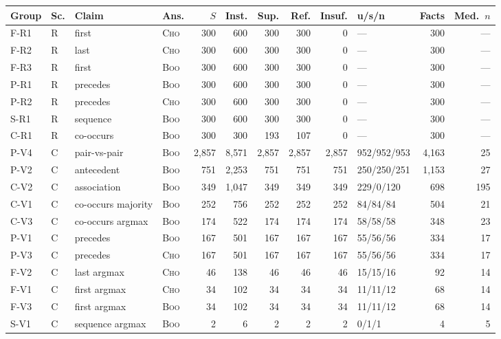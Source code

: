 \begin{table}[t]
\centering
\small
\begin{tabular}{llllrrrrrlrr}
\toprule
Group & Sc. & Claim & Ans. & $S$ & Inst. & Sup. & Ref. & Insuf. & u/s/n & Facts & Med.\ $n$ \\
\midrule
F-R1 & R & first & \textsc{Cho} & 300 & 600 & 300 & 300 & 0 & --- & 300 & --- \\
F-R2 & R & last & \textsc{Cho} & 300 & 600 & 300 & 300 & 0 & --- & 300 & --- \\
F-R3 & R & first & \textsc{Boo} & 300 & 600 & 300 & 300 & 0 & --- & 300 & --- \\
P-R1 & R & precedes & \textsc{Boo} & 300 & 600 & 300 & 300 & 0 & --- & 300 & --- \\
P-R2 & R & precedes & \textsc{Cho} & 300 & 600 & 300 & 300 & 0 & --- & 300 & --- \\
S-R1 & R & sequence & \textsc{Boo} & 300 & 600 & 300 & 300 & 0 & --- & 300 & --- \\
C-R1 & R & co-occurs & \textsc{Boo} & 300 & 300 & 193 & 107 & 0 & --- & 300 & --- \\
\midrule
P-V4 & C & pair-vs-pair & \textsc{Boo} & 2{,}857 & 8{,}571 & 2{,}857 & 2{,}857 & 2{,}857 & 952/952/953 & 4{,}163 & 25 \\
P-V2 & C & antecedent & \textsc{Boo} & 751 & 2{,}253 & 751 & 751 & 751 & 250/250/251 & 1{,}153 & 27 \\
C-V2 & C & association & \textsc{Boo} & 349 & 1{,}047 & 349 & 349 & 349 & 229/0/120 & 698 & 195 \\
C-V1 & C & co-occurs majority & \textsc{Boo} & 252 & 756 & 252 & 252 & 252 & 84/84/84 & 504 & 21 \\
C-V3 & C & co-occurs argmax & \textsc{Boo} & 174 & 522 & 174 & 174 & 174 & 58/58/58 & 348 & 23 \\
P-V1 & C & precedes & \textsc{Boo} & 167 & 501 & 167 & 167 & 167 & 55/56/56 & 334 & 17 \\
P-V3 & C & precedes & \textsc{Cho} & 167 & 501 & 167 & 167 & 167 & 55/56/56 & 334 & 17 \\
F-V2 & C & last argmax & \textsc{Cho} & 46 & 138 & 46 & 46 & 46 & 15/15/16 & 92 & 14 \\
F-V1 & C & first argmax & \textsc{Cho} & 34 & 102 & 34 & 34 & 34 & 11/11/12 & 68 & 14 \\
F-V3 & C & first argmax & \textsc{Boo} & 34 & 102 & 34 & 34 & 34 & 11/11/12 & 68 & 14 \\
S-V1 & C & sequence argmax & \textsc{Boo} & 2 & 6 & 2 & 2 & 2 & 0/1/1 & 4 & 5 \\

\end{tabular}
\end{table}
